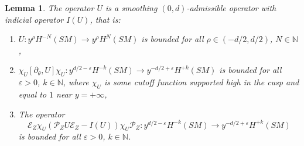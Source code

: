 \documentclass[10pt]{amsart}
\newcommand{\N}{\mathbb{N}}
\newcommand{\eps}{\varepsilon}
\newcommand{\mc}{\mathcal}
\theoremstyle{plain}
\newtheorem{lemma}{Lemma}[section]
\theoremstyle{definition}
\begin{document}
\begin{lemma}
\label{lemma:remainder}
The operator $U$ is a smoothing $(0,d)$-admissible operator with indicial operator $I(U)$, that is:
\begin{enumerate}
\item\label{lemma:remainder1} $U : y^\rho H^{-N}(SM) \to y^\rho H^{N}(SM)$ is bounded for all $\rho\in (-d/2, d/2)$, $N \in \N$,
\item\label{lemma:remainder2} $\chi_U[\partial_\theta, U]\chi_U : y^{d/2-\eps}H^{-k}(SM) \to y^{-d/2+\eps} H^{+k}(SM)$ is bounded for all $\eps>0$, $k \in \N$, where $\chi_U$ is some cutoff function supported high in the cusp and equal to $1$ near $y=+\infty$,
\item\label{lemma:remainder3}
The operator
\[
\mc{E}_Z \chi_U\left(\mathcal{P}_Z U \mathcal{E}_Z - I(U)\right)\chi_U \mc{P}_Z : y^{d/2-\eps}H^{-k}(SM) \to y^{-d/2+\eps} H^{+k}(SM)
\]
is bounded for all $\eps>0$, $k\in \N$.
\end{enumerate}
\end{lemma}

\end{document}

